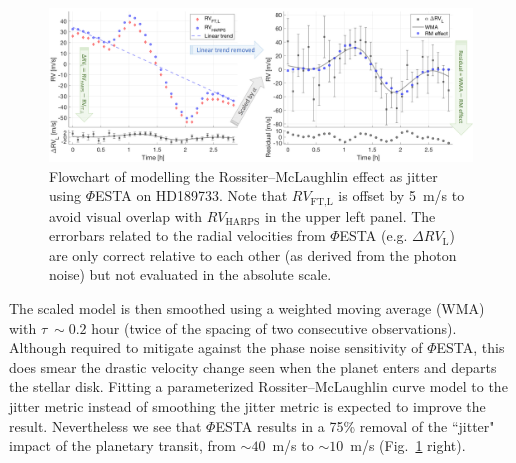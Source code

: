 \begin{figure}[tbp]
\centering
\includegraphics[width = 1.0 \linewidth]
{./Figures/Methods/HD189733.png}
\caption[HD189733: modelling Rossiter–McLaughlin effect as jitter]
		{Flowchart of modelling the Rossiter–McLaughlin effect as jitter using $\mathit{\Phi}$ESTA on HD189733. Note that $RV_\text{FT,L}$ is offset by 5~m/s to avoid visual overlap with $RV_\text{HARPS}$ in the upper left panel. The errorbars related to the radial velocities from $\mathit{\Phi}$ESTA (e.g. $\Delta RV_\text{L}$) are only correct relative to each other (as derived from the photon noise) but not evaluated in the absolute scale.}
\label{fig:HD189733}
\end{figure} 

The scaled model is then smoothed using a weighted moving average (WMA) with $\tau~\sim0.2$ hour (twice of the spacing of two consecutive observations). Although required to mitigate against the phase noise sensitivity of $\mathit{\Phi}$ESTA, this does smear the drastic velocity change seen when the planet enters and departs the stellar disk. Fitting a parameterized Rossiter–McLaughlin curve model to the jitter metric instead of smoothing the jitter metric is expected to improve the result. Nevertheless we see that $\mathit{\Phi}$ESTA results in a 75\% removal of the ``jitter" impact of the planetary transit, from $\sim 40$~m/s to $\sim 10$~m/s (Fig.~\ref{fig:HD189733} right). 


%
%

